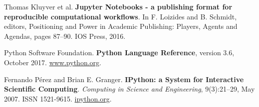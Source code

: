 \documentclass[runningheads]{llncs}
\begin{document}
%
%
% 
% 
%
\begin{thebibliography}{8}
    Thomas Kluyver et al.
    \textbf{Jupyter Notebooks - a publishing format for reproducible computational workflows}.
    In F. Loizides and B. Schmidt, editors, Positioning and Power in Academic Publishing: Players, Agents and Agendas, pages 87–90. IOS Press, 2016.

    Python Software Foundation.
    \textbf{Python Language Reference}, version 3.6, October 2017. \url{www.python.org}.

    Fernando Pérez and Brian E. Granger.
    \textbf{IPython: a System for Interactive Scientific Computing}.
    \emph{Computing in Science and Engineering}, 9(3):21–29, May 2007. ISSN 1521-9615. \url{ipython.org}.
\end{thebibliography}
\end{document}
